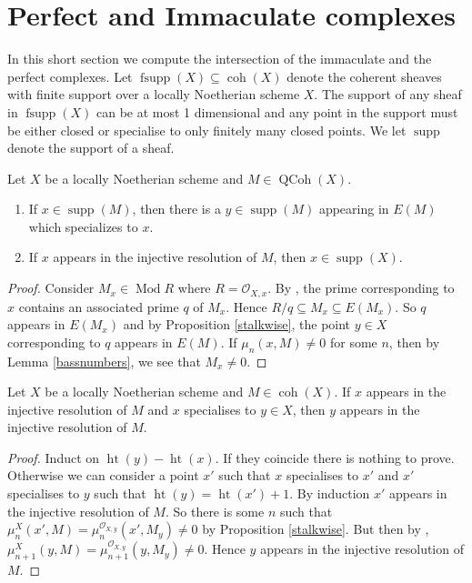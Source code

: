 \documentclass[12pt,oneside]{amsart}
\DeclareMathOperator{\Mod}{Mod}
\DeclareMathOperator{\coh}{coh}
\DeclareMathOperator{\QCoh}{QCoh}
\DeclareMathOperator{\supp}{supp}
\DeclareMathOperator{\hgt}{ht}
\DeclareMathOperator{\fsupp}{fsupp}
\begin{document}
\section{Perfect and Immaculate complexes}
\label{perfimmacsec}

In this short section we compute the intersection of the immaculate and the perfect complexes. Let $\fsupp(X) \subseteq \coh(X)$ denote the coherent sheaves with finite support over a locally Noetherian scheme $X$. The support of any sheaf in $\fsupp(X)$ can be at most 1 dimensional and any point in the support must be either closed or specialise to only finitely many closed points. We let $\supp$ denote the support of a sheaf.

\begin{lemma} \label{imperflem1}
Let $X$ be a locally Noetherian scheme and $M \in \QCoh(X)$. 
\begin{enumerate}
\item If $x \in \supp(M)$, then there is a $y \in \supp(M)$ appearing in $E(M)$ which specializes to $x$.

\item If $x$ appears in the injective resolution of $M$, then $x \in \supp(X)$. 
\end{enumerate}

\end{lemma}

\begin{proof}
Consider $M_x \in \Mod R$ where $R = \mathcal{O}_{X,x}$. By \cite[Tag 05BV]{stacks-project}, the prime corresponding to $x$ contains an associated prime $q$ of $M_x$. Hence $R/q \subseteq M_x \subseteq E(M_x)$. So $q$ appears in $E(M_x)$ and by Proposition \ref{stalkwise}, the point $y \in X$ corresponding to $q$ appears in $E(M)$. If $\mu_n(x,M) \neq 0$ for some $n$, then by Lemma \ref{bassnumbers}, we see that $M_x \neq 0$. 
\end{proof}


\begin{lemma}\label{imperflem2}
Let $X$ be a locally Noetherian scheme and $M \in \coh(X)$. If $x$ appears in the injective resolution of $M$ and $x$ specialises to $y \in X$, then $y$ appears in the injective resolution of $M$.
\end{lemma}

\begin{proof}
Induct on $\hgt(y) - \hgt(x)$. If they coincide there is nothing to prove. Otherwise we can consider a point $x'$ such that $x$ specialises to $x'$ and $x'$ specialises to $y$ such that $\hgt(y) = \hgt(x') + 1$. By induction $x'$ appears in the injective resolution of $M$. So there is some $n$ such that $\mu_n^X(x',M) = \mu_n^{\mathcal{O}_{X,y}}(x',M_y) \neq 0$ by Proposition \ref{stalkwise}. But then by  \cite[Proposition 9.2.13]{EJ11}, $\mu_{n+1}^X(y,M) = \mu_{n+1}^{\mathcal{O}_{X,y}}(y,M_y) \neq 0$. Hence $y$ appears in the injective resolution of $M$. 
\end{proof}
\end{document}
